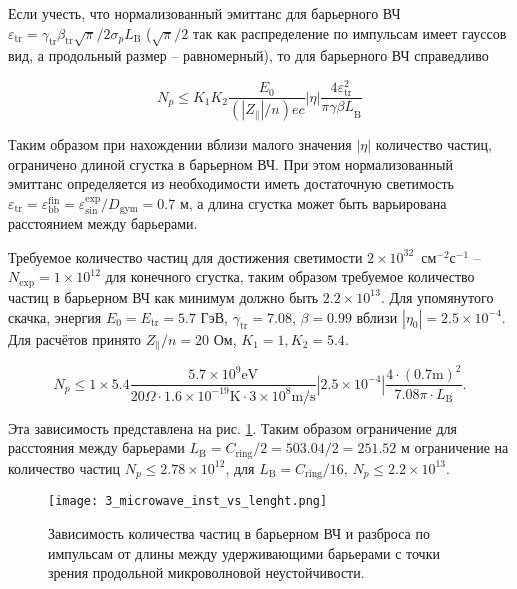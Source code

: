 \noindent Если учесть, что нормализованный эмиттанс для барьерного ВЧ $\varepsilon_{\textrm{tr}}=\gamma_{\textrm{tr}}\beta_{\textrm{tr}}\sqrt{\pi}/2\sigma_p L_{\textrm{B}}$ ($\sqrt{\pi}/2$ так как распределение по импульсам имеет гауссов вид, а продольный размер -- равномерный), то для барьерного ВЧ справедливо

\begin{equation}
N_p\le K_1K_2\frac{E_0}{\left(\left|Z_\parallel\right|/n\right)ec}\left|\eta\right|\frac{4\varepsilon_{\text{tr}}^2}{{\pi\gamma\beta L}_{\textrm{B}}}
\label{eq:microwave_instability_2}
\end{equation}

\noindent Таким образом при нахождении вблизи малого значения $\left|\eta\right|$ количество частиц, ограничено длиной сгустка в барьерном ВЧ. При этом нормализованный эмиттанс определяется из необходимости иметь достаточную светимость $\varepsilon_{\textrm{tr}}=\varepsilon_{\textrm{bb}}^{\textrm{fin}}=\varepsilon_{\textrm{sin}}^{\textrm{exp}}/D_{\textrm{gym}}=0.7$ м, а длина сгустка может быть варьирована расстоянием между барьерами. 

\par Требуемое количество частиц для достижения светимости $2\times10^{32}$~см$^{-2}$с$^{-1}$ – $N_{\textrm{exp}}=1\times10^{12}$ для конечного сгустка, таким образом требуемое количество частиц в барьерном ВЧ как минимум должно быть $2.2\times10^{13}$. Для упомянутого скачка, энергия $E_0=E_{\textrm{tr}}=5.7$ ГэВ, $\gamma_{\textrm{tr}}=7.08$, $\beta=0.99$ вблизи $\left|\eta_0\right|=2.5\times10^{-4}$. Для расчётов принято $Z_\parallel/n=20$ Ом, $K_1=1, K_2=5.4$.

\begin{equation}
N_p\le1\times5.4\frac{5.7\times10^{9} \text{eV}}{20 \Omega \cdot 1.6\times10^{-19} \text{K} \cdot 3\times10^{8} \text{m/s}} |2.5\times10^{-4}|\frac{4\cdot(0.7 \text{m})^2}{7.08 \pi \cdot L_{\text{B}}}.
\label{eq:microwave_instability_example}
\end{equation}

\noindent Эта зависимость представлена на рис. \ref{fig:3_microwave_inst_vs_lenght.png}. Таким образом ограничение для расстояния между барьерами $L_{\text{B}}=C_{\textrm{ring}}/2=503.04/2=251.52$ м ограничение на количество частиц $N_p\le2.78\times10^{12}$, для $L_{\textrm{B}}=C_{\textrm{ring}}/16$, $N_p\le2.2\times10^{13}$.

\begin{figure}
\centering
   \texttt{[image: 3\_microwave\_inst\_vs\_lenght.png]}
   \caption{Зависимость количества частиц в барьерном ВЧ и разброса по импульсам от длины между удерживающими барьерами с точки зрения продольной микроволновой неустойчивости.}
   \label{fig:3_microwave_inst_vs_lenght.png}
\end{figure}

